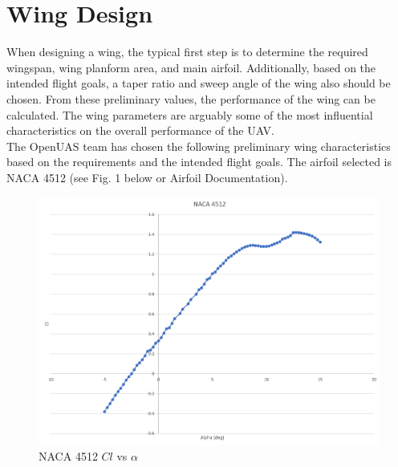 \documentclass{article}
\begin{document}
\newpage

\section{Wing Design}

When designing a wing, the typical first step is to determine the required wingspan, wing planform area, and main airfoil. Additionally, based on the intended flight goals, a taper ratio and sweep angle of the wing also should be chosen. From these preliminary values, the performance of the wing can be calculated. The wing parameters are arguably some of the most influential characteristics on the overall performance of the UAV. \\

\noindent The OpenUAS team has chosen the following preliminary wing characteristics based on the requirements and the intended flight goals. The airfoil selected is NACA 4512 (see Fig. 1 below or Airfoil Documentation). \\

\begin{figure}[ht]
\begin{center}
	\includegraphics[scale=0.4]{NACA4512clvsalpha.png}
	\caption{NACA 4512 $Cl$ vs $\alpha$}
	\label{Figure 1:}

\end{center}
\end{figure}
\end{document}
